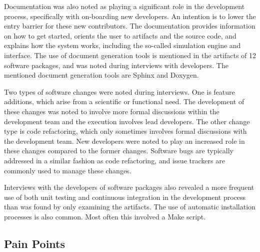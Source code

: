 \documentclass[12pt, notitlepage]{article}
\begin{document}
Documentation was also noted as playing a significant role in the development process, specifically with on-boarding new developers. An intention is to lower the entry barrier for these new contributors. The documentation provides information on how to get started, orients the user to artifacts and the source code, and explains how the system works, including the so-called simulation engine and interface. The use of document generation tools is mentioned in the artifacts of 12 software packages, and was noted during interviews with developers. The mentioned document generation tools are Sphinx and Doxygen. 

Two types of software changes were noted during interviews. One is feature additions, which arise from a scientific or functional need. The development of these changes was noted to involve more formal discussions within the development team and the execution involves lead developers. The other change type is code refactoring, which only sometimes involves formal discussions with the development team. New developers were noted to play an increased role in these changes compared to the former changes. Software bugs are typically addressed in a similar fashion as code refactoring, and issue trackers are commonly used to manage these changes. 

Interviews with the developers of software packages also revealed a more frequent use of both unit testing and continuous integration in the development process than was found by only examining the artifacts. The use of automatic installation processes is also common. Most often this involved a Make script.


\subsection{Pain Points}
\end{document}
